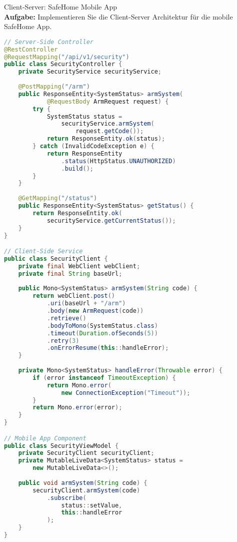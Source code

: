 \begin{example2}[breakable]{Client-Server: SafeHome Mobile App}\\
\textbf{Aufgabe:} Implementieren Sie die Client-Server Architektur für die mobile SafeHome App.

\begin{lstlisting}[language=Java, style=basesmol]
// Server-Side Controller
@RestController
@RequestMapping("/api/v1/security")
public class SecurityController {
    private SecurityService securityService;
    
    @PostMapping("/arm")
    public ResponseEntity<SystemStatus> armSystem(
            @RequestBody ArmRequest request) {
        try {
            SystemStatus status = 
                securityService.armSystem(
                    request.getCode());
            return ResponseEntity.ok(status);
        } catch (InvalidCodeException e) {
            return ResponseEntity
                .status(HttpStatus.UNAUTHORIZED)
                .build();
        }
    }
    
    @GetMapping("/status")
    public ResponseEntity<SystemStatus> getStatus() {
        return ResponseEntity.ok(
            securityService.getCurrentStatus());
    }
}

// Client-Side Service
public class SecurityClient {
    private final WebClient webClient;
    private final String baseUrl;
    
    public Mono<SystemStatus> armSystem(String code) {
        return webClient.post()
            .uri(baseUrl + "/arm")
            .body(new ArmRequest(code))
            .retrieve()
            .bodyToMono(SystemStatus.class)
            .timeout(Duration.ofSeconds(5))
            .retry(3)
            .onErrorResume(this::handleError);
    }
    
    private Mono<SystemStatus> handleError(Throwable error) {
        if (error instanceof TimeoutException) {
            return Mono.error(
                new ConnectionException("Timeout"));
        }
        return Mono.error(error);
    }
}

// Mobile App Component
public class SecurityViewModel {
    private SecurityClient securityClient;
    private MutableLiveData<SystemStatus> status = 
        new MutableLiveData<>();
    
    public void armSystem(String code) {
        securityClient.armSystem(code)
            .subscribe(
                status::setValue,
                this::handleError
            );
    }
}
\end{lstlisting}
\end{example2}

